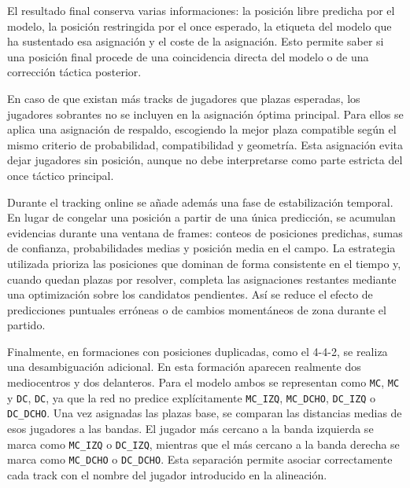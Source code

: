 El resultado final conserva varias informaciones: la posición libre predicha por el modelo, la posición restringida por el once esperado, la etiqueta del modelo que ha sustentado esa asignación y el coste de la asignación. Esto permite saber si una posición final procede de una coincidencia directa del modelo o de una corrección táctica posterior.

En caso de que existan más tracks de jugadores que plazas esperadas, los jugadores sobrantes no se incluyen en la asignación óptima principal. Para ellos se aplica una asignación de respaldo, escogiendo la mejor plaza compatible según el mismo criterio de probabilidad, compatibilidad y geometría. Esta asignación evita dejar jugadores sin posición, aunque no debe interpretarse como parte estricta del once táctico principal.

Durante el tracking online se añade además una fase de estabilización temporal. En lugar de congelar una posición a partir de una única predicción, se acumulan evidencias durante una ventana de frames: conteos de posiciones predichas, sumas de confianza, probabilidades medias y posición media en el campo. La estrategia utilizada prioriza las posiciones que dominan de forma consistente en el tiempo y, cuando quedan plazas por resolver, completa las asignaciones restantes mediante una optimización sobre los candidatos pendientes. Así se reduce el efecto de predicciones puntuales erróneas o de cambios momentáneos de zona durante el partido.

Finalmente, en formaciones con posiciones duplicadas, como el 4-4-2, se realiza una desambiguación adicional. En esta formación aparecen realmente dos mediocentros y dos delanteros. Para el modelo ambos se representan como \texttt{MC}, \texttt{MC} y \texttt{DC}, \texttt{DC}, ya que la red no predice explícitamente \texttt{MC\_IZQ}, \texttt{MC\_DCHO}, \texttt{DC\_IZQ} o \texttt{DC\_DCHO}. Una vez asignadas las plazas base, se comparan las distancias medias de esos jugadores a las bandas. El jugador más cercano a la banda izquierda se marca como \texttt{MC\_IZQ} o \texttt{DC\_IZQ}, mientras que el más cercano a la banda derecha se marca como \texttt{MC\_DCHO} o \texttt{DC\_DCHO}. Esta separación permite asociar correctamente cada track con el nombre del jugador introducido en la alineación.
